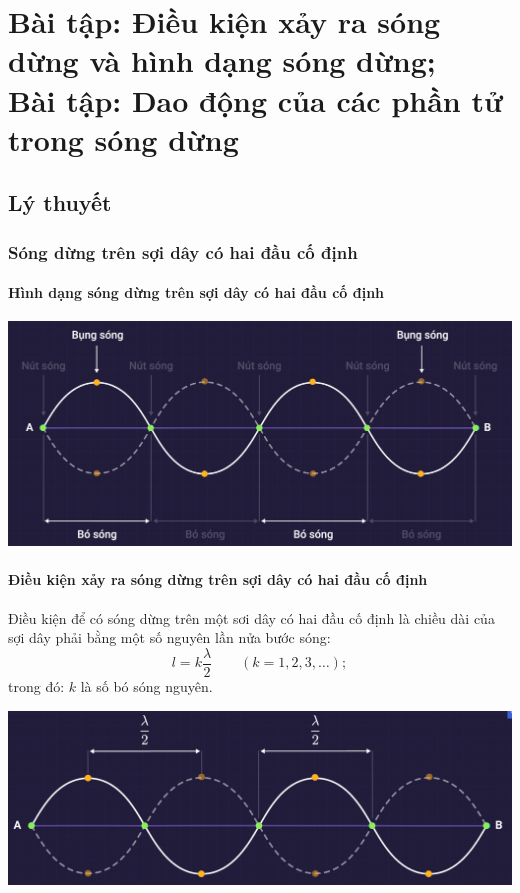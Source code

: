 
\chapter[Bài tập: Điều kiện xảy ra sóng dừng và hình dạng sóng dừng;\\Bài tập: Dao động của các phần tử trong sóng dừng]{Bài tập: Điều kiện xảy ra sóng dừng và hình dạng sóng dừng;\\Bài tập: Dao động của các phần tử trong sóng dừng}
\section{Lý thuyết}
\subsection{Sóng dừng trên sợi dây có hai đầu cố định}
\subsubsection{Hình dạng sóng dừng trên sợi dây có hai đầu cố định}
\begin{center}
	\includegraphics[scale=0.35]{../figs/VN12-PH-12-A-008-1-V2-1.png}
\end{center}
\subsubsection{Điều kiện xảy ra sóng dừng trên sợi dây có hai đầu cố định}
Điều kiện để có sóng dừng trên một sơi dây có hai đầu cố định là chiều dài của sợi dây phải bằng một số nguyên lần nửa bước sóng:
\begin{equation*}
	l=k\dfrac{\lambda}{2}\qquad(k=1,2,3,\ldots);
\end{equation*}
trong đó: $k$ là số bó sóng nguyên.

\begin{center}
	\includegraphics[scale=0.4]{../figs/VN12-PH-12-A-008-1-V2-2.png}
\end{center}
